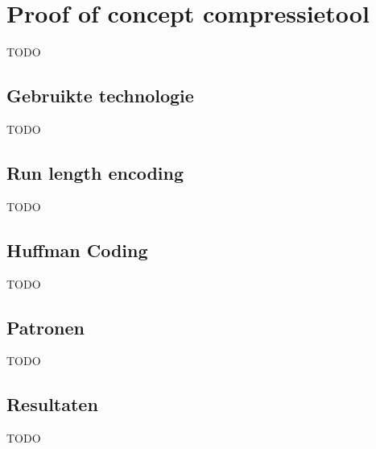 \chapter{Proof of concept compressietool}
\label{ch:compressietool}

TODO

\section{Gebruikte technologie}
\label{sec:compressietool-gebruikte-technologie}

TODO

\section{Run length encoding}
\label{sec:compressietool-rle}

TODO

\section{Huffman Coding}
\label{sec:compressietool-huffman}

TODO

\section{Patronen}
\label{sec:compressietool-patronen}

TODO

\section{Resultaten}
\label{sec:compressietool-resultaten}

TODO
